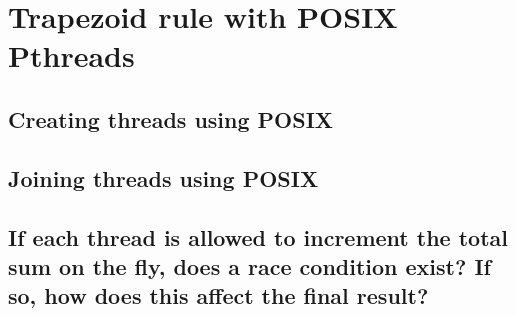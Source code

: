 

\section{Trapezoid rule with POSIX Pthreads}

\subsection{Creating threads using POSIX}

\vspace{0.5cm}



\subsection{Joining threads using POSIX}

\vspace{0.5cm}



\subsection{If each thread is allowed to increment the total sum on the fly, does a race condition exist?
If so, how does this affect the final result?}

